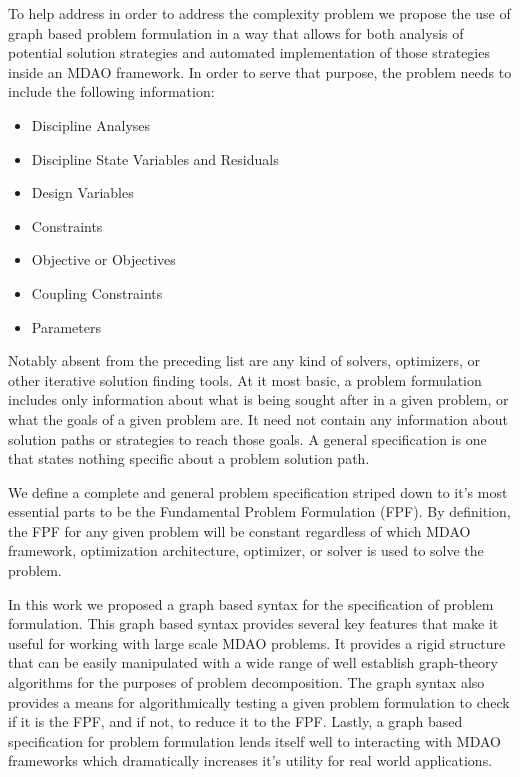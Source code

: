 \documentclass[]{aiaa-tc} %
\begin{document}
    To help address in order to address the complexity problem we propose the use of graph based problem formulation 
    in a way that allows for both analysis of potential solution strategies and automated implementation of those strategies 
    inside an MDAO framework. In order to serve that purpose, the problem  needs to include the following information: 
    \begin{itemize}
       \item Discipline Analyses 
       \item Discipline State Variables and Residuals
       \item Design Variables
       \item Constraints
       \item Objective or Objectives
       \item Coupling Constraints
       \item Parameters
    \end{itemize}
    Notably absent from the preceding list are any kind of solvers, optimizers, or other iterative solution finding tools. 
    At it most basic, a problem formulation includes only information about what is being sought after in a given problem, or what the
    goals of a given problem are. It need not contain any information about solution paths or strategies to reach those goals. 
    A general specification is one that states nothing specific about a problem solution path. 

    We define a complete and general problem specification striped down to it's most essential parts to be the 
    Fundamental Problem Formulation (FPF). By definition, the FPF for any given problem will be constant regardless 
    of which MDAO framework, optimization architecture, optimizer, or solver is used to solve the problem.

    In this work we proposed a graph based syntax for the specification of problem formulation. This graph based syntax provides several key
    features that make it useful for working with large scale MDAO problems. It provides a rigid structure that can be easily manipulated 
    with a wide range of well establish graph-theory algorithms for the purposes of problem decomposition. The graph syntax also 
    provides a means for algorithmically testing a given problem formulation to check if it is the FPF, and if not, to reduce it to the FPF. 
    Lastly, a graph based specification for problem formulation lends itself well to interacting with MDAO frameworks which dramatically 
    increases it's utility for real world applications. 
\end{document}
